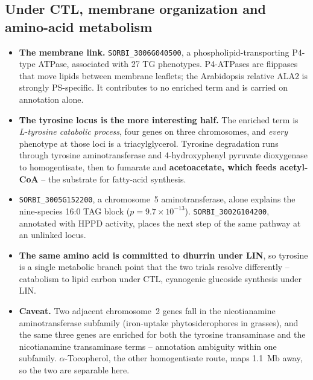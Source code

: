\documentclass[11pt]{article}
\newcommand{\lead}[1]{\textbf{#1}}
\begin{document}
\subsection{Under CTL, membrane organization and amino-acid metabolism}
\begin{itemize}
  \item \lead{The membrane link.} \texttt{SORBI\_3006G040500}, a
        phospholipid-transporting P4-type ATPase, associated with 27 TG
        phenotypes. P4-ATPases are flippases that move lipids between membrane
        leaflets; the Arabidopsis relative ALA2 is strongly PS-specific. It
        contributes to no enriched term and is carried on annotation alone.
  \item \lead{The tyrosine locus is the more interesting half.} The enriched term
        is \textit{L-tyrosine catabolic process}, four genes on three chromosomes,
        and \emph{every} phenotype at those loci is a triacylglycerol. Tyrosine
        degradation runs through tyrosine aminotransferase and 4-hydroxyphenyl\-%
        pyruvate dioxygenase to homogentisate, then to fumarate and
        \lead{acetoacetate, which feeds acetyl-CoA} -- the substrate for
        fatty-acid synthesis.
  \item \texttt{SORBI\_3005G152200}, a chromosome~5 aminotransferase, alone
        explains the nine-species 16:0 TAG block ($p=9.7\times10^{-13}$).
        \texttt{SORBI\_3002G104200}, annotated with HPPD activity, places the next
        step of the same pathway at an unlinked locus.
  \item \lead{The same amino acid is committed to dhurrin under LIN}, so tyrosine
        is a single metabolic branch point that the two trials resolve
        differently -- catabolism to lipid carbon under CTL, cyanogenic glucoside
        synthesis under LIN.
  \item \lead{Caveat.} Two adjacent chromosome~2 genes fall in the nicotianamine
        aminotransferase subfamily (iron-uptake phytosiderophores in grasses), and
        the same three genes are enriched for both the tyrosine transaminase and
        the nicotianamine transaminase terms -- annotation ambiguity within one
        subfamily. $\alpha$-Tocopherol, the other homogentisate route, maps 1.1~Mb
        away, so the two are separable here.
\end{itemize}
\end{document}
